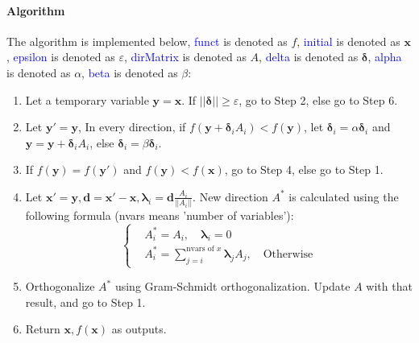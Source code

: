\documentclass{article}
\begin{document}
\paragraph{Algorithm}
The algorithm is implemented below, \textcolor{blue}{funct} is denoted as $f$, \textcolor{blue}{initial} is denoted as $\mathbf{x}$, \textcolor{blue}{epsilon} is denoted as $\varepsilon$, \textcolor{blue}{dirMatrix} is denoted as $A$, \textcolor{blue}{delta} is denoted as $\mathbf{\delta}$, \textcolor{blue}{alpha} is denoted as $\alpha$, \textcolor{blue}{beta} is denoted as $\beta$:
\begin{enumerate}
    \item Let a temporary variable $\mathbf{y} = \mathbf{x}$. If $||\mathbf{\delta}|| \geqslant \varepsilon$, go to Step 2, else go to Step 6.
    \item Let $\mathbf{y'} = \mathbf{y}$, In every direction, if $f(\mathbf{y} + \mathbf{\delta}_i A_i) < f(\mathbf{y})$, let $\mathbf{\delta}_i = \alpha \mathbf{\delta}_i$ and $\mathbf{y} = \mathbf{y} + \mathbf{\delta}_i A_i$, else $\mathbf{\delta}_i = \beta \mathbf{\delta}_i$.
    \item If $f(\mathbf{y}) = f(\mathbf{y'})$ and $f(\mathbf{y}) < f(\mathbf{x})$, go to Step 4, else go to Step 1.
    \item Let $\mathbf{x'} = \mathbf{y}, \mathbf{d} = \mathbf{x'} - \mathbf{x}, \mathbf{\lambda}_i = \mathbf{d} \frac{A_i}{||A_i||}$. New direction $A^*$ is calculated using the following formula (nvars means 'number of variables'):
    \begin{equation*}
        \left\{
        \begin{aligned}
            & A^*_i = A_i, \quad \mathbf{\lambda}_i = 0 \\
            & A^*_i = \sum_{j = i}^{\mbox{nvars of $x$}}{\mathbf{\lambda}_j A_j}, \quad \mbox{Otherwise}
        \end{aligned}
        \right.
    \end{equation*}
    \item Orthogonalize $A^*$ using Gram-Schmidt orthogonalization. Update $A$ with that result, and go to Step 1.
    \item Return $\mathbf{x}, f(\mathbf{x})$ as outputs.
\end{enumerate}
\end{document}
